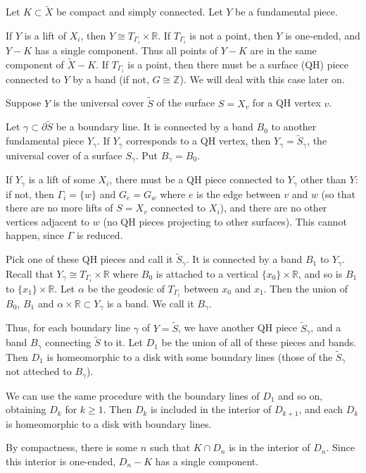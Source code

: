 \documentclass[12pt]{amsart}
\newcommand{\Z}{\mathbb{Z}}
\newcommand{\R}{\mathbb{R}}
\begin{document}
Let $K\subset \tilde X$ be compact and simply connected. Let $Y$ be a fundamental piece.

If $Y$ is a lift of $X_i$, then $Y\cong T_{\Gamma_i}\times\R$. If $T_{\Gamma_i}$ is not a point, then $Y$ is one-ended, and $Y-K$ has a single component. Thus all points of $Y-K$ are in the same component of $\tilde X - K$. If $T_{\Gamma_i}$ is a point, then there must be a surface (QH) piece connected to $Y$ by a band (if not, $G\cong\Z$). We will deal with this case later on. 

Suppose $Y$ is the universal cover $\tilde S$ of the surface $S=X_v$ for a QH vertex $v$. 

Let $\gamma\subset\partial \tilde S$ be a boundary line. It is connected by a band $B_0$ to another fundamental piece $Y_{\gamma}$. If $Y_{\gamma}$ corresponds to a QH vertex, then $Y_{\gamma} = \tilde S_{\gamma}$, the universal cover of a surface $S_{\gamma}$. Put $B_{\gamma}=B_0$. 

If $Y_{\gamma}$ is a lift of some $X_i$, there must be a QH piece connected to $Y_{\gamma}$ other than $Y$: if not, then $\Gamma_i = \{w \}$ and  $G_e = G_w$ where $e$ is the edge between $v$ and $w$ (so that there are no more lifts of $S=X_v$ connected to $X_i$), and there are no other vertices adjacent to $w$ (no QH pieces projecting to other surfaces). This cannot happen, since $\Gamma$ is reduced. 

Pick one of these QH pieces and call it $\tilde S_{\gamma}$. It is connected by a band $B_1$ to $Y_{\gamma}$. Recall that $Y_{\gamma} \cong T_{\Gamma_i} \times \R$ where $B_0$ is attached to a vertical $\{x_0 \}\times \R$, and so is $B_1$ to $\{x_1 \}\times \R$. Let $\alpha$ be the geodesic of $T_{\Gamma_i}$ between $x_0$ and $x_1$. Then the union of $B_0$, $B_1$ and $\alpha \times \R \subset Y_{\gamma}$ is a band. We call it $B_{\gamma}$.

Thus, for each boundary line $\gamma$ of $Y = \tilde S$, we have another QH piece $\tilde S_{\gamma}$, and a band $B_{\gamma}$ connecting $\tilde S$ to it. Let $D_1$ be the union of all of these pieces and bands. Then $D_1$ is homeomorphic to a disk with some boundary lines (those of the $\tilde S_{\gamma}$ not atteched to $B_{\gamma}$).


We can use the same procedure with the boundary lines of $D_1$ and so on, obtaining $D_k$ for $k\geq 1$. Then $D_k$ is included in the interior of $D_{k+1}$, and each $D_k$ is homeomorphic to a disk with boundary lines.


By compactness, there is some $n$ such that $K \cap D_n$ is in the interior of $D_n$. Since this interior is one-ended, $D_n-K$ has a single component.
\end{document}
